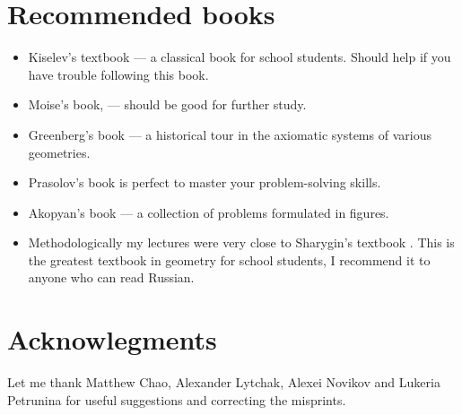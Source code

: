 \section*{Recommended books}

\begin{itemize}
\item Kiselev's textbook \cite{kiselev} ---
a classical book for school students.
Should help if you have trouble following this book.

\item Moise's book, \cite{moise} ---
should be good for further study.

\item Greenberg's book \cite{greenberg}  --- a historical tour in the axiomatic systems of various geometries.

\item Prasolov's book \cite{prasolov} is perfect to master your problem-solving skills.

\item Akopyan's book \cite{akopyan} --- a collection of problems formulated in figures.

\item Methodologically my lectures
were very close to Sharygin's  textbook \cite{sharygin}.
This is the greatest textbook in geometry for school students,
I recommend it to anyone who can read Russian.


\end{itemize}

\section*{Acknowlegments}

Let me thank  
Matthew Chao, 
Alexander Lytchak,
Alexei Novi\-kov
and Lukeria Petrunina
for useful suggestions and correcting the misprints.






